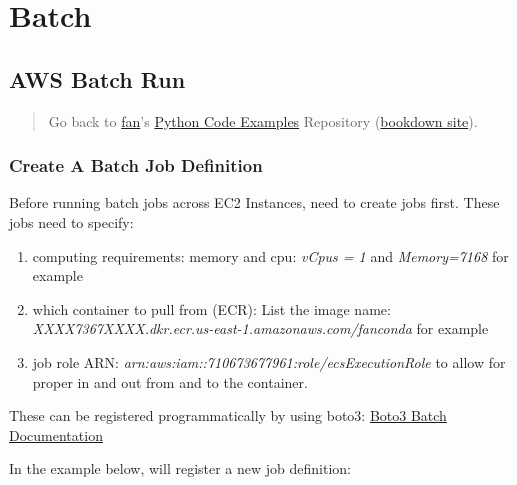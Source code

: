 \documentclass[
]{book}
\providecommand{\tightlist}{%
  \setlength{\itemsep}{0pt}\setlength{\parskip}{0pt}}
\begin{document}
\hypertarget{batch}{%
\section{Batch}\label{batch}}

\hypertarget{aws-batch-run}{%
\subsection{AWS Batch Run}\label{aws-batch-run}}

\begin{quote}
Go back to \href{http://fanwangecon.github.io/}{fan}'s \href{https://fanwangecon.github.io/pyfan/}{Python Code Examples} Repository (\href{https://fanwangecon.github.io/pyfan/bookdown}{bookdown site}).
\end{quote}

\hypertarget{create-a-batch-job-definition}{%
\subsubsection{Create A Batch Job Definition}\label{create-a-batch-job-definition}}

Before running batch jobs across EC2 Instances, need to create jobs first. These jobs need to specify:

\begin{enumerate}
\def\labelenumi{\arabic{enumi}.}
\tightlist
\item
  computing requirements: memory and cpu: \emph{vCpus = 1} and \emph{Memory=7168} for example
\item
  which container to pull from (ECR): List the image name: \emph{XXXX7367XXXX.dkr.ecr.us-east-1.amazonaws.com/fanconda} for example
\item
  job role ARN: \emph{arn:aws:iam::710673677961:role/ecsExecutionRole} to allow for proper in and out from and to the container.
\end{enumerate}

These can be registered programmatically by using boto3: \href{https://boto3.amazonaws.com/v1/documentation/api/latest/reference/services/batch.html}{Boto3 Batch Documentation}

In the example below, will register a new job definition:
\end{document}
